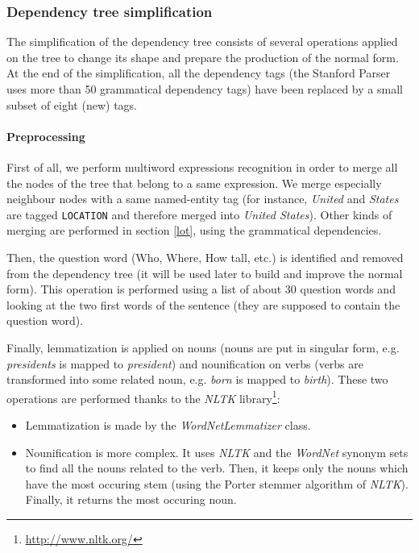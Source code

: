
\subsubsection{Dependency tree simplification}
\label{dts}

The simplification of the dependency tree consists of several operations applied on the tree to change its shape and prepare the production of the normal form. At the end of the simplification, all the dependency tags (the Stanford Parser uses more than 50 grammatical dependency tags) have been replaced by a small subset of eight (new) tags.


\paragraph{Preprocessing}
\label{pre}

First of all, we perform multiword expressions recognition in order to merge all the nodes of the tree that belong to a same expression. We merge especially neighbour nodes with a same named-entity tag (for instance, \textit{United} and \textit{States} are tagged \texttt{LOCATION} and therefore merged into \textit{United States}). Other kinds of merging are performed in section \ref{lot}, using the grammatical dependencies.

Then, the question word (Who, Where, How tall, etc.) is identified and removed from the dependency tree (it will be used later to build and improve the normal form). This operation is performed using a list of about 30 question words and looking at the two first words of the sentence (they are supposed to contain the question word).

Finally, lemmatization is applied on nouns (nouns are put in singular form, e.g. \textit{presidents} is mapped to \textit{president}) and nounification on verbs (verbs are transformed into some related noun, e.g. \textit{born} is mapped to \textit{birth}).
These two operations are performed thanks to the \emph{NLTK} library\footnote{\url{http://www.nltk.org/}}:
\begin{itemize}
    \item Lemmatization is made by the \emph{WordNetLemmatizer} class.
    \item Nounification is more complex. It uses \emph{NLTK} and the \emph{WordNet} synonym sets to find all the nouns related to the verb. Then, it keeps only the nouns which have the most occuring stem (using the Porter stemmer algorithm of \emph{NLTK}). Finally, it returns the most occuring noun.
\end{itemize}

